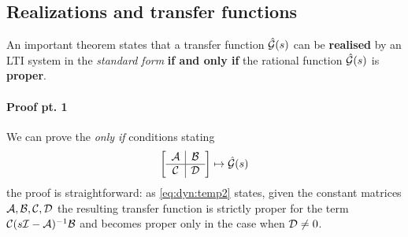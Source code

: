 	\subsection*{Realizations and transfer functions}
		An important theorem states that a transfer function $\hat {\mathcal{G}}(s)$ can be \textbf{realised} by an LTI system in the \textit{standard form} \textbf{if and only if} the rational function $\hat {\mathcal{G}}(s)$ is \textbf{proper}.
		
		\paragraph{Proof pt. 1} We can prove the \textit{only if} conditions stating
		\[ \begin{bmatrix} \begin{array}{c|c}
				\mathcal{A} & \mathcal{B} \\ \hline \mathcal{C} & \mathcal{D}
		\end{array} \end{bmatrix} \mapsto \hat {\mathcal{G}}(s) \]
		the proof is straightforward: as \ref{eq:dyn:temp2} states, given the constant matrices $\mathcal{A},\mathcal{B},\mathcal{C},\mathcal{D}$ the resulting transfer function is strictly proper for the term $\mathcal{C}(s\mathcal{I}-\mathcal{A})^{-1}\mathcal{B}$ and becomes proper only in the case when $\mathcal{D}\neq 0$.
		
